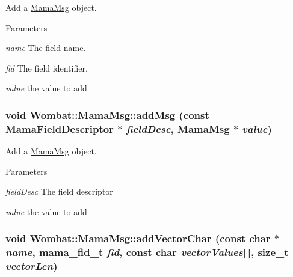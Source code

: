 Add a \hyperlink{classWombat_1_1MamaMsg}{MamaMsg} object. 
\begin{DoxyParams}{Parameters}
\item[{\em name}]The field name. \item[{\em fid}]The field identifier. \item[{\em value}]the value to add \end{DoxyParams}
\hypertarget{classWombat_1_1MamaMsg_a75e2d206741f7c1c6052a429c12035ed}{
\subsubsection[{addMsg}]{\setlength{\rightskip}{0pt plus 5cm}void Wombat::MamaMsg::addMsg (const {\bf MamaFieldDescriptor} $\ast$ {\em fieldDesc}, \/  {\bf MamaMsg} $\ast$ {\em value})}}
\label{classWombat_1_1MamaMsg_a75e2d206741f7c1c6052a429c12035ed}


Add a \hyperlink{classWombat_1_1MamaMsg}{MamaMsg} object. 
\begin{DoxyParams}{Parameters}
\item[{\em fieldDesc}]The field descriptor \item[{\em value}]the value to add \end{DoxyParams}
\hypertarget{classWombat_1_1MamaMsg_abc454788b158e60d7728e6b82718d49d}{
\subsubsection[{addVectorChar}]{\setlength{\rightskip}{0pt plus 5cm}void Wombat::MamaMsg::addVectorChar (const char $\ast$ {\em name}, \/  mama\_\-fid\_\-t {\em fid}, \/  const char {\em vectorValues}\mbox{[}$\,$\mbox{]}, \/  size\_\-t {\em vectorLen})}}
\label{classWombat_1_1MamaMsg_abc454788b158e60d7728e6b82718d49d}


